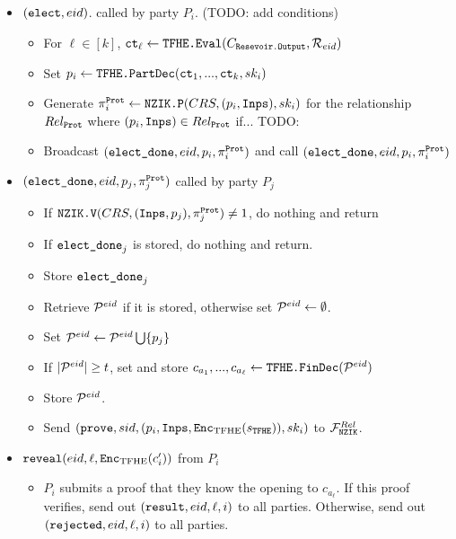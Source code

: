 \begin{mdframed}
\begin{itemize}
		\item $(\texttt{elect}, {eid})$. called by party $P_i$. (TODO: add conditions)
		      \begin{itemize}
						\item For $\ell \in [k]$, $\texttt{ct}_\ell \gets \texttt{TFHE.Eval}(C_{\texttt{Resevoir.Output}}, \mathcal{R}_{eid})$
					  \item Set $p_i \gets \texttt{TFHE.PartDec}(\texttt{ct}_1, ..., \texttt{ct}_k, sk_i)$
						\item Generate $\pi_{i}^{\texttt{Prot}} \gets \texttt{NZIK.P}(CRS, (p_i, \texttt{Inps}), sk_i) $
						for the relationship $Rel_\texttt{Prot}$ where $(p_i, \texttt{Inps}) \in Rel_\texttt{Prot}$ if... TODO:
						\item Broadcast $(\texttt{elect\_done}, {eid}, p_i, \pi_{i}^{\texttt{Prot}})$ and call $(\texttt{elect\_done}, {eid}, p_i, \pi_{i}^{\texttt{Prot}})$
					\end{itemize}
		\item $(\texttt{elect\_done}, {eid}, p_j, \pi_{j}^{\texttt{Prot}})$ called by party $P_j$
					\begin{itemize}
						\item If $\texttt{NZIK.V}(CRS, (\texttt{Inps}, p_j), \pi_{j}^{\texttt{Prot}}) \neq 1$, do nothing and return
						\item If $\texttt{elect\_done}_j$ is stored, do nothing and return.
						\item Store $\texttt{elect\_done}_j$
					  \item Retrieve $\mathcal{P}^{eid}$ if it is stored, otherwise set $\mathcal{P}^{eid} \gets \emptyset$.
					  \item Set $\mathcal{P}^{eid} \gets \mathcal{P}^{eid} \bigcup \{p_j\}$
					  \item If $|\mathcal{P}^{eid}| \geq t$, set and store $c_{a_1}, ..., c_{a_\ell} \gets \texttt{TFHE.FinDec}(\mathcal{P}^{eid})$
					  \item Store $\mathcal{P}^{eid}$.
			      \item Send $(\texttt{prove}, sid, (p_i, \texttt{Inps}, \texttt{Enc}_{\mathrm{TFHE}}(s_{\texttt{TFHE}})), sk_i)$ to $\mathcal{F}_{\texttt{NZIK}}^{Rel}$.
		      \end{itemize}
		      \pagebreak
		\item $\texttt{reveal}({eid}, \ell, \texttt{Enc}_{\mathrm{TFHE}}(c'_i))$ from $P_i$
		      \begin{itemize}
			      \item $P_i$ submits a proof that they know the opening to $c_{a_\ell}$.
			            If this proof verifies, send out $(\texttt{result}, {eid}, \ell, i)$ to all parties.
			            Otherwise, send out $(\texttt{rejected}, {eid}, \ell, i)$ to all parties.
		      \end{itemize}
	\end{itemize}
\end{mdframed}

